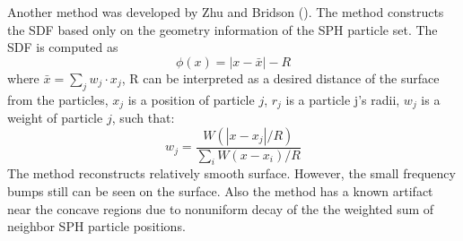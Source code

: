 Another method was developed by Zhu and Bridson (\cite{ZhuBridson}). The method constructs the SDF based only on the geometry information of the SPH particle set. The SDF is computed as 
\begin{equation}
	\phi(x) = |x - \bar{x}| - R
\end{equation}
where $\bar{x} = \sum_j{w_j \cdot x_j}$, R can be interpreted as a desired distance of the
surface from the particles, $x_j$ is a position of particle $j$, $r_j$ is a particle j's radii, $w_j$ is a weight of particle $j$, such that:
\begin{equation}
	w_j = \dfrac{W(|x - x_j|/R)}{\sum_i{W(x - x_i)/R}}
\end{equation}
The method reconstructs relatively smooth surface. However, the small frequency bumps still can be seen on the surface. Also the method has a known artifact near the concave regions due to nonuniform decay of the the weighted sum of neighbor SPH particle positions.

